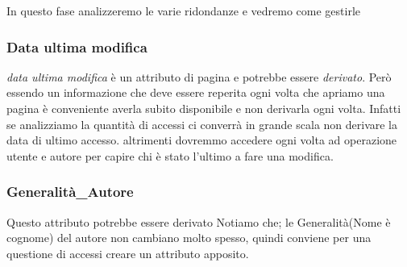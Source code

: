 In questo fase analizzeremo le varie ridondanze e vedremo come gestirle
\subsubsection{Data ultima modifica}
\textit{data ultima modifica} è un attributo di pagina e potrebbe essere \textit{derivato}. Però essendo un informazione che deve essere reperita ogni volta che apriamo una pagina è conveniente averla subito disponibile e non  derivarla ogni volta.
Infatti se analizziamo la quantità di accessi ci converrà in grande scala non derivare la data di ultimo accesso. altrimenti dovremmo accedere ogni volta ad operazione utente e autore per capire chi è stato l'ultimo a fare una modifica. 

\subsubsection{Generalità\_Autore}
Questo attributo potrebbe essere derivato Notiamo che; le Generalità(Nome è cognome) del autore non cambiano molto spesso, quindi conviene per una questione di accessi creare un attributo apposito.